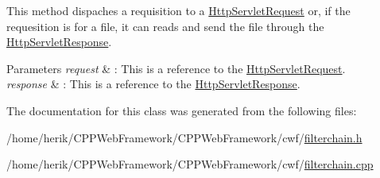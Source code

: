 This method dispaches a requisition to a \hyperlink{class_c_w_f_1_1_http_servlet_request}{Http\+Servlet\+Request} or, if the requesition is for a file, it can reads and send the file through the \hyperlink{class_c_w_f_1_1_http_servlet_response}{Http\+Servlet\+Response}. 


\begin{DoxyParams}{Parameters}
{\em request} & \+: This is a reference to the \hyperlink{class_c_w_f_1_1_http_servlet_request}{Http\+Servlet\+Request}. \\
\hline
{\em response} & \+: This is a reference to the \hyperlink{class_c_w_f_1_1_http_servlet_response}{Http\+Servlet\+Response}. \\
\hline
\end{DoxyParams}


The documentation for this class was generated from the following files\+:\begin{DoxyCompactItemize}
\item 
/home/herik/\+C\+P\+P\+Web\+Framework/\+C\+P\+P\+Web\+Framework/cwf/\hyperlink{filterchain_8h}{filterchain.\+h}\item 
/home/herik/\+C\+P\+P\+Web\+Framework/\+C\+P\+P\+Web\+Framework/cwf/\hyperlink{filterchain_8cpp}{filterchain.\+cpp}\end{DoxyCompactItemize}
